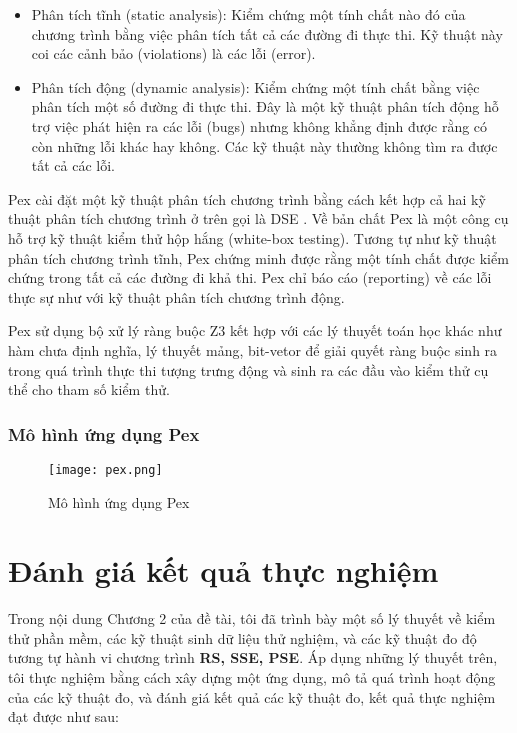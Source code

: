 \begin{itemize}
	\item Phân tích tĩnh (static analysis): Kiểm chứng một tính chất nào đó của chương trình bằng việc phân tích tất cả các đường đi thực thi. Kỹ thuật này coi các cảnh bảo (violations) là các lỗi (error).
	\item Phân tích động (dynamic analysis): Kiểm chứng một tính chất bằng việc phân tích một số đường đi thực thi. Đây là một kỹ thuật phân tích động hỗ trợ việc phát hiện ra các lỗi (bugs) nhưng không khẳng định được rằng có còn những lỗi khác hay không. Các kỹ thuật này thường không tìm ra được tất cả các lỗi.
\end{itemize}

Pex cài đặt một kỹ thuật phân tích chương trình bằng cách kết hợp cả hai kỹ thuật phân tích chương trình ở trên gọi là DSE \cite{xie2009fitness, godefroid2005dart}. Về bản chất Pex là một công cụ hỗ trợ kỹ thuật kiểm thử hộp hắng (white-box testing). Tương tự như kỹ thuật phân tích chương trình tĩnh, Pex chứng minh được rằng một tính chất được kiểm chứng trong tất cả các đường đi khả thi. Pex chỉ báo cáo (reporting) về các lỗi thực sự như với kỹ thuật phân tích chương trình động.

Pex sử dụng bộ xử lý ràng buộc Z3 \cite{de2008z3} kết hợp với các lý thuyết toán học khác như hàm chưa định nghĩa, lý thuyết mảng, bit-vetor \cite{kroening2016decision} để giải quyết ràng buộc sinh ra trong quá trình thực thi tượng trưng động và sinh ra các đầu vào kiểm thử cụ thể cho tham số kiểm thử.

\subsubsection*{Mô hình ứng dụng Pex}
\begin{center}
	\begin{figure}[H]
		\begin{center}
			\texttt{[image: pex.png]}
		\end{center}
		\caption{Mô hình ứng dụng Pex}
		
	\end{figure}
\end{center}

\section{Đánh giá kết quả thực nghiệm}

Trong nội dung Chương 2 của đề tài, tôi đã trình bày một số lý thuyết về kiểm
thử phần mềm, các kỹ thuật sinh dữ liệu thử nghiệm, và các kỹ thuật đo
độ tương tự hành vi chương trình \textbf{RS, SSE, PSE}. Áp dụng những
lý thuyết trên, tôi thực nghiệm bằng cách xây dựng một ứng dụng, mô tả
quá trình hoạt động của các kỹ thuật đo, và đánh giá kết quả các kỹ
thuật đo, kết quả thực nghiệm đạt được như sau:

